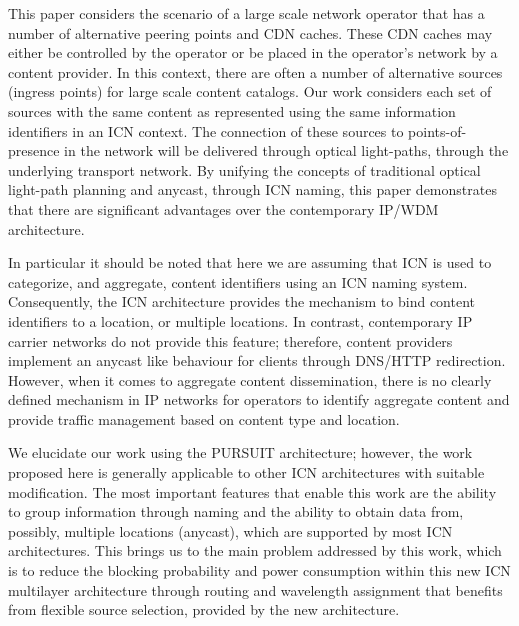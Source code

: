 \documentclass[journal]{IEEEtran}
\begin{document}
This paper considers the scenario of a large scale network operator
that has a number of alternative peering points and CDN caches. These
CDN caches may either be controlled by the operator or be placed in
the operator's network by a content provider. In this context, there
are often a number of alternative sources (ingress points) for large
scale content catalogs. Our work considers each set of sources with
the same content as represented using the same information identifiers
in an ICN context. The connection of these sources to points-of-presence in the network will be delivered through optical light-paths,
through the underlying transport network. By unifying the concepts of
traditional optical light-path planning and anycast, through ICN
naming, this paper demonstrates that there are significant
advantages over the contemporary IP/WDM architecture.

In particular it should be noted that here we are assuming that ICN is
used to categorize, and aggregate, content identifiers using an ICN
naming system. Consequently, the ICN architecture provides the
mechanism to bind content identifiers to a location, or multiple
locations. In contrast, contemporary IP carrier networks do not
provide this feature; therefore, content providers implement an
anycast like behaviour for clients through DNS/HTTP
redirection. However, when it comes to aggregate content
dissemination, there is no clearly defined mechanism in IP networks
for operators to identify aggregate content and provide traffic
management based on content type and location.

We elucidate our work using the PURSUIT architecture; however, the work proposed here is generally applicable to other ICN architectures with suitable modification. The most important features that enable this work are the ability to group information through naming and the ability to obtain data from, possibly, multiple locations (anycast), which are supported by most ICN architectures.
This brings us to the main problem addressed by this work, which is to
reduce the blocking probability and power consumption within this new ICN multilayer architecture
through routing and wavelength assignment that benefits from flexible source selection, provided by the new architecture. 
\end{document}
